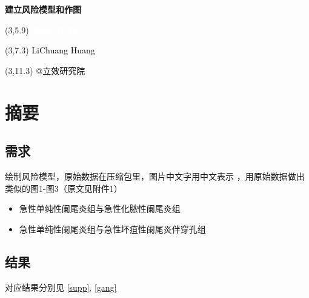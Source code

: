 \documentclass[
]{article}
\author{}
\date{\vspace{-2.5em}}
\providecommand{\tightlist}{%
  \setlength{\itemsep}{0pt}\setlength{\parskip}{0pt}}
\begin{document}
\begin{titlepage} 
\begin{center} \textbf{\Huge 建立风险模型和作图}
\vspace{4em} \begin{textblock}{10}(3,5.9) \huge
\textbf{\textcolor{white}{2024-02-29}}
\end{textblock} \begin{textblock}{10}(3,7.3)
\Large \textcolor{black}{LiChuang Huang}
\end{textblock} \begin{textblock}{10}(3,11.3)
\Large \textcolor{black}{@立效研究院}
\end{textblock} \end{center} \end{titlepage}
\restoregeometry


\tableofcontents

\listoffigures

\listoftables

\newpage


\hypertarget{abstract}{%
\section{摘要}\label{abstract}}

\hypertarget{ux9700ux6c42}{%
\subsection{需求}\label{ux9700ux6c42}}

绘制风险模型，原始数据在压缩包里，图片中文字用中文表示 ，用原始数据做出类似的图1-图3（原文见附件1）

\begin{itemize}
\tightlist
\item
  急性单纯性阑尾炎组与急性化脓性阑尾炎组
\item
  急性单纯性阑尾炎组与急性坏疽性阑尾炎伴穿孔组
\end{itemize}

\hypertarget{ux7ed3ux679c}{%
\subsection{结果}\label{ux7ed3ux679c}}

对应结果分别见 \ref{supp}, \ref{gang}
\end{document}

